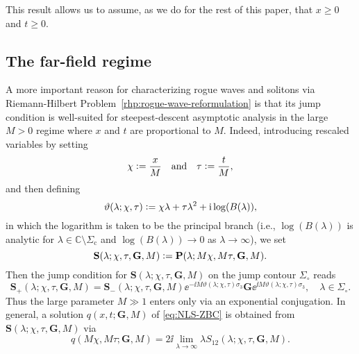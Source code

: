 This result allows us to assume, as we do for the rest of this paper, that $x\ge 0$ and $t\ge 0$.  

\subsection{The far-field regime}
A more important reason for characterizing rogue waves and solitons via Riemann-Hilbert Problem~\ref{rhp:rogue-wave-reformulation} is that its jump condition is well-suited for steepest-descent asymptotic analysis in the large $M>0$ regime where $x$ and $t$ are proportional to $M$.  Indeed, introducing rescaled variables by setting
\begin{equation}
\chi\vcentcolon= \frac{x}{M}\quad \text{and} \quad \tau\vcentcolon= \frac{t}{M},
\end{equation}
and then defining 
\begin{equation}
\vartheta(\lambda;\chi,\tau)\defeq\chi\lambda + \tau\lambda^2 +\ii\log\left(B(\lambda)\right),
\label{eq:vartheta}
\end{equation}
in which the logarithm is taken to be the principal branch (i.e., $\log(B(\lambda))$ is analytic for $\lambda\in\mathbb{C}\setminus\Sigma_\mathrm{c}$ and $\log(B(\lambda))\to 0$ as $\lambda\to\infty$), we set
\begin{equation}
\mathbf{S}(\lambda;\chi,\tau,\mathbf{G},M)\vcentcolon=\mathbf{P}(\lambda;M\chi,M\tau,\mathbf{G},M).
\label{eq:S-from-P}
\end{equation}
Then the jump condition for $\mathbf{S}(\lambda;\chi,\tau,\mathbf{G},M)$ on the jump contour $\Sigma_\circ$ reads
\begin{equation}
\mathbf{S}_+(\lambda;\chi,\tau,\mathbf{G},M)=\mathbf{S}_-(\lambda;\chi,\tau,\mathbf{G},M)\ee^{-\ii M\vartheta(\lambda;\chi,\tau)\sigma_3}\mathbf{G}\ee^{\ii M\vartheta(\lambda;\chi,\tau)\sigma_3},\quad\lambda\in\Sigma_\circ.
\label{eq:S-jump}
\end{equation}
Thus the large parameter $M\gg 1$ enters only via an exponential conjugation.  In general, a solution $q(x,t;\mathbf{G},M)$ of \eqref{eq:NLS-ZBC} is obtained from $\mathbf{S}(\lambda;\chi,\tau,\mathbf{G},M)$ via
\begin{equation}
q(M\chi,M\tau;\mathbf{G},M)=2\ii\lim_{\lambda\to\infty} \lambda S_{12}(\lambda;\chi,\tau,\mathbf{G},M).
\label{eq:q-S}
\end{equation}
